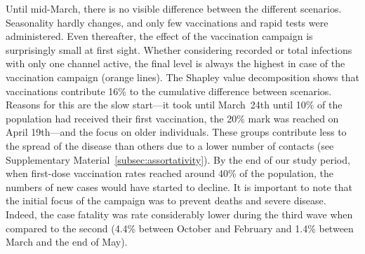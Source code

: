 \begin{figure}[!tp]
\end{figure}

Until mid-March, there is no visible difference between the different scenarios.
Seasonality hardly changes, and only few vaccinations and rapid tests were administered.
Even thereafter, the effect of the vaccination campaign is surprisingly small at first
sight. Whether considering recorded or total infections with only one channel active, the
final level is always the highest in case of the vaccination campaign (orange lines). The
Shapley value decomposition shows that vaccinations contribute 16\% to the cumulative
difference between scenarios. Reasons for this are the slow start---it took until
March~24th until 10\% of the population had received their first vaccination, the 20\%
mark was reached on April 19th---and the focus on older individuals. These groups
contribute less to the spread of the disease than others due to a lower number of
contacts (see Supplementary
Material~\ref{subsec:assortativity}). By the end of our study
period, when first-dose vaccination rates reached around 40\% of the population, the
numbers of new cases would have started to decline. It is important to note that the
initial focus of the campaign was to prevent deaths and severe disease. Indeed, the case
fatality was rate considerably lower during the third wave when compared to the second
(4.4\% between October and February and 1.4\% between March and the end of
May).

